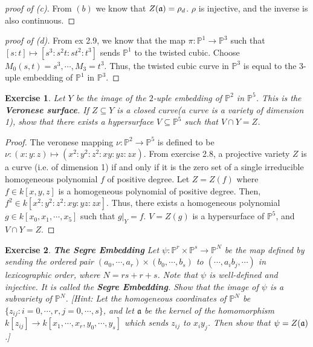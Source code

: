 \documentclass[12pt,letterpaper]{article}
\newtheorem{problem}{Exercise}[section]
\theoremstyle{definition}
\theoremstyle{remark}
\numberwithin{equation}{section}
\numberwithin{figure}{problem}
\let\Im\relax
\DeclareMathOperator{\Im}{im}
\newcommand{\PP}{\mathbb{P}}
\begin{document}
\begin{proof}[proof of (c)]
From $(b)$ we know that $Z(\mathfrak{a}) = \Im \rho_d$. $\rho$ is injective, and the inverse is also continuous.  
\end{proof}

\begin{proof}[proof of (d)] From ex 2.9, we know that the map $\pi: \PP^1 \to \PP^3$ such that $[s:t] \mapsto [s^3: s^2t: st^2: t^3]$ sends $\PP^1$ to the twisted cubic. Choose $M_0(s,t) = s^3, \cdots, M_3 = t^3$. Thus, the twisted cubic curve in $\PP^3$ is equal to the $3$-uple embedding of $\PP^1$ in $\PP^3$. 

\end{proof}


\begin{problem} Let $Y$ be the image of the $2$-uple embedding of $\PP^2$ in $\PP^5$. This is the \textbf{Veronese surface}. If $Z \subseteq Y$ is a closed curve(a curve is a variety of dimension 1), show that there exists a hypersurface $V \subseteq \PP^5$ such that $V \cap Y = Z$. 
\end{problem}

\begin{proof}
The veronese mapping $\nu: \PP^2 \to \PP^5$ is defined to be $\nu: (x:y:z) \mapsto (x^2: y^2:z^2:xy:yz:zx)$. From exercise 2.8, a projective variety $Z$ is a curve (i.e. of dimension 1) if and only if it is the zero set of a single irreducible homogeneous polynomial $f$ of positive degree. Let $Z = Z(f)$ where $f \in k[x,y,z]$ is a homogeneous polynomial of positive degree. Then, $f^2 \in k[x^2:y^2:z^2:xy:yz:zx]$. Thus, there exists a homogeneous polynomial $g \in k[x_0, x_1, \cdots, x_5]$ such that $g|_Y = f$. $V = Z(g)$ is a hypersurface of $\PP^5$, and $V \cap Y = Z$. 
\end{proof}

\begin{problem} \textbf{The Segre Embedding} Let $\psi : \PP^r \times \PP^s \to \PP^N$ be the map defined by sending the ordered pair $(a_0, \cdots, a_r) \times (b_0, \cdots, b_s)$ to $(\cdots, a_ib_j, \cdots)$ in lexicographic order, where $N = rs + r +s$. Note that $\psi$ is well-defined and injective. It is called the \textbf{Segre Embedding}. Show that the image of $\psi$ is a subvariety of $\PP^N$. [Hint: Let the homogeneous coordinates of $\PP^N$ be $\{z_{ij}:i=0, \cdots, r, j = 0,\cdots, s\}$, and let $\mathfrak{a}$ be the kernel of the homomorphism $k[{z_{ij}}] \to k [x_1, \cdots, x_r, y_0, \cdots, y_s]$ which sends $z_{ij}$ to $x_iy_j$. Then show that $\Im \psi = Z(\mathfrak{a})$.]
\end{problem}
\end{document}
